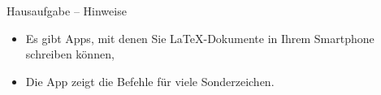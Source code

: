 \begin{frame}{Hausaufgabe -- Hinweise}

\begin{itemize}
	
	\item Es gibt Apps, mit denen Sie \LaTeX -Dokumente in Ihrem Smartphone schreiben können, \zB {}
	
	\item Die App  zeigt die Befehle für viele Sonderzeichen.
	
\end{itemize}

\end{frame}


%
%
%


%	
%	
%	
%
%
%
